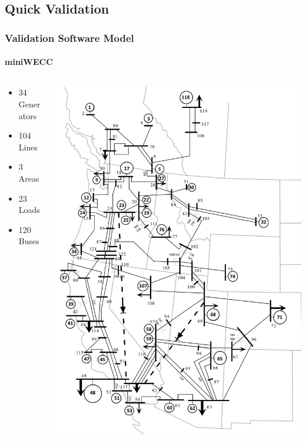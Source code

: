 \documentclass[14pt, unknownkeysallowed]{beamer}
\begin{document}
\subsection{Quick Validation}
\begin{frame}
\frametitle{Validation Software Model}
\framesubtitle{miniWECC}
\begin{columns}
	\begin{column}{0.45\textwidth}
		\begin{itemize}
			\item 34 Generators
			\item 104 Lines
			\item 3 Areas
			\item 23 Loads
			\item 120 Buses
		\end{itemize}
	\end{column}
	\begin{column}{.5\textwidth}
		\includegraphics[height=.8\textheight]{miniWECCpres} 
		{\tiny\cite{RJminiWECC}}%
	\end{column}
\end{columns}
\end{frame}
\end{document}
